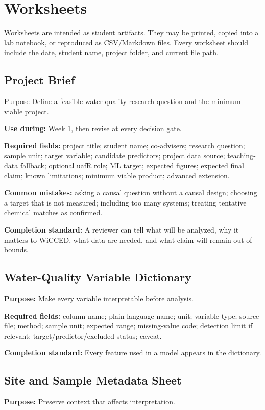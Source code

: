 \chapter{Worksheets}

Worksheets are intended as student artifacts. They may be printed, copied into a lab notebook, or reproduced as CSV/Markdown files. Every worksheet should include the date, student name, project folder, and current file path.

\section{Project Brief}
\begin{programbox}{Purpose}
Define a feasible water-quality research question and the minimum viable project.
\end{programbox}
\textbf{Use during:} Week 1, then revise at every decision gate.

\textbf{Required fields:} project title; student name; co-advisers; research question; sample unit; target variable; candidate predictors; project data source; teaching-data fallback; optional uafR role; ML target; expected figures; expected final claim; known limitations; minimum viable product; advanced extension.

\textbf{Common mistakes:} asking a causal question without a causal design; choosing a target that is not measured; including too many systems; treating tentative chemical matches as confirmed.

\textbf{Completion standard:} A reviewer can tell what will be analyzed, why it matters to WiCCED, what data are needed, and what claim will remain out of bounds.

\section{Water-Quality Variable Dictionary}
\textbf{Purpose:} Make every variable interpretable before analysis.

\textbf{Required fields:} column name; plain-language name; unit; variable type; source file; method; sample unit; expected range; missing-value code; detection limit if relevant; target/predictor/excluded status; caveat.

\textbf{Completion standard:} Every feature used in a model appears in the dictionary.

\section{Site and Sample Metadata Sheet}
\textbf{Purpose:} Preserve context that affects interpretation.

